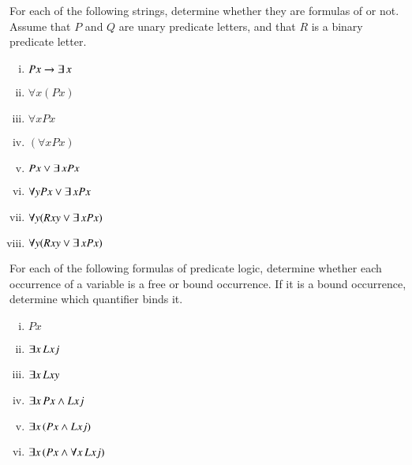 \documentclass[nobib,nofonts]{tufte-handout}
\newcommand{\predlog}{\acro{PredLog}}
\begin{document}
\bigskip
\noindent \colorbox{mygray}{\centering
  \begin{minipage}{1.0\textwidth}

    \begin{exercise}
      For each of the following strings, determine whether they are formulas of \predlog or not. Assume that $P$ and $Q$ are unary predicate letters, and that $R$ is a binary predicate letter.
      \begin{multicols}{2}
      \begin{enumerate}[(i)]
        \item $Px \rightarrow \exists \thinspace x$
        \item $\forall x (Px)$
        \item $\forall x Px$
        \item $(\forall x Px)$
        \item $Px \vee \exists \thinspace x Px$
        \item $\forall y Px \vee \exists \thinspace x Px$
        \item $\forall y (Rxy \vee \exists \thinspace x Px)$
        \item $\forall y (Rxy \vee \exists \thinspace x Px)$
      \end{enumerate}
    \end{multicols}
    \end{exercise}

    \begin{exercise}
      For each of the following formulas of predicate logic, determine whether each occurrence of a variable is a free or bound occurrence. If it is a bound occurrence, determine which quantifier binds it.
      \begin{multicols}{2}
      \begin{enumerate}[(i)]
        \item $Px$
        \item $\exists x \thinspace Lxj$
        \item $\exists x \thinspace Lxy$
        \item $\exists x \thinspace Px \wedge Lxj$
        \item $\exists x \thinspace (Px \wedge Lxj)$
        \item $\exists x \thinspace (Px \wedge \forall x \thinspace Lxj)$
      \end{enumerate}
    \end{multicols}
    \end{exercise}


\end{minipage}}
\end{document}
